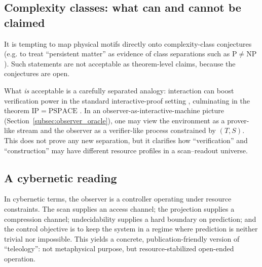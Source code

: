 \subsection{Complexity classes: what can and cannot be claimed}
It is tempting to map physical motifs directly onto complexity-class conjectures (e.g. to treat ``persistent matter'' as evidence of class separations such as $\mathrm{P}\ne\mathrm{NP}$).
Such statements are not acceptable as theorem-level claims, because the conjectures are open.

What \emph{is} acceptable is a carefully separated analogy:
interaction can boost verification power in the standard interactive-proof setting \cite{GoldwasserMicaliRackoff1989}, culminating in the theorem $\mathrm{IP}=\mathrm{PSPACE}$ \cite{Shamir1992}.
In an observer-as-interactive-machine picture (Section~\ref{subsec:observer_oracle}), one may view the environment as a prover-like stream and the observer as a verifier-like process constrained by $(T,S)$.
This does not prove any new separation, but it clarifies how ``verification'' and ``construction'' may have different resource profiles in a scan--readout universe.

\subsection{A cybernetic reading}
In cybernetic terms, the observer is a controller operating under resource constraints.
The scan supplies an access channel; the projection supplies a compression channel; undecidability supplies a hard boundary on prediction; and the control objective is to keep the system in a regime where prediction is neither trivial nor impossible.
This yields a concrete, publication-friendly version of ``teleology'': not metaphysical purpose, but resource-stabilized open-ended operation.
